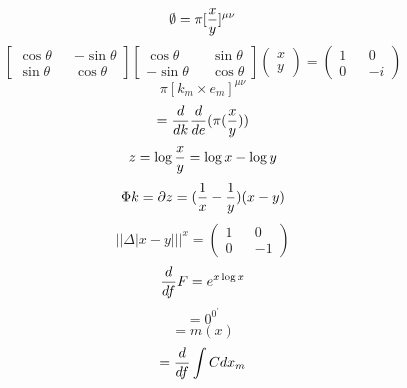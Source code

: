 \documentclass{jsarticle}
\begin{document}
\title{}
\author{}
\date{}
\maketitle

  
  $$ \emptyset = \pi [{x \over y}]^{\mu\nu}  $$
  $$ \begin{bmatrix} \cos \theta && - \sin \theta \\
  \sin \theta && \cos \theta \end{bmatrix} \begin{bmatrix} \cos \theta && 
	  \sin \theta \\
  - \sin \theta && \cos \theta \end{bmatrix}  \begin{pmatrix} x \\
  y \end{pmatrix} = \begin{pmatrix} 1 && 0 \\
  0 && - i \end{pmatrix} $$
  $$ \pi [k_m \times e_m]^{\mu\nu} $$
  $$ = {d \over dk}{d \over de}(\pi {({x \over y})}) $$
  $$ z = \log {x \over y} = \log x - \log y $$
  $$ \mathrm{\Phi}k = \partial z = ({1 \over x} - {1 \over y})(x - y) $$
  $$ ||\Delta |x - y|||^{x} = \begin{pmatrix} 1 && 0 \\
  0 && -1 \end{pmatrix} $$
  $$ {d \over df}F = e^{x \log x} $$
  $$ = 0^{0^{'}} $$
  $$ = m(x) $$
  $$ = {d \over df}\int C dx_m $$
\end{document}

